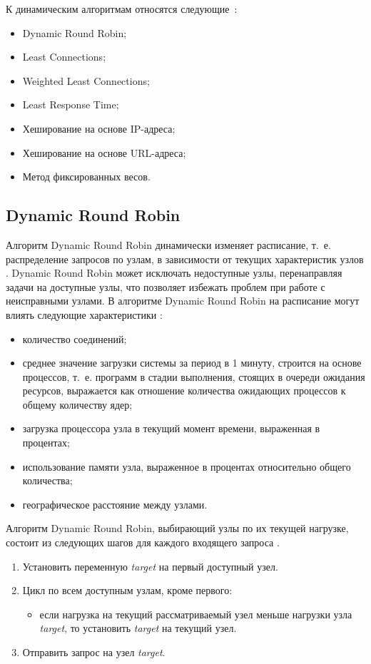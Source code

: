 К динамическим алгоритмам относятся следующие~\cite{drr, dll_warsh, mainsource}:
\begin{itemize}
	\item Dynamic Round Robin;
	\item Least Connections;
	\item Weighted Least Connections;
	\item Least Response Time;
	\item Хеширование на основе IP-адреса;
	\item Хеширование на основе URL-адреса;
	\item Метод фиксированных весов.
\end{itemize}


\subsection{Dynamic Round Robin}

Алгоритм Dynamic Round Robin динамически изменяет расписание, т.~е. распределение запросов по узлам, в зависимости от текущих характеристик узлов \cite{drr}. Dynamic Round Robin может исключать недоступные узлы, перенаправляя задачи на доступные узлы, что позволяет избежать проблем при работе с неисправными узлами. 
В алгоритме Dynamic Round Robin на расписание могут влиять следующие характеристики \cite{dll_warsh, com_analysis, part_algos}: 
\begin{itemize}
	\item количество соединений;
	\item среднее значение загрузки системы за период в 1 минуту, строится на основе процессов, т.~е. программ в стадии выполнения, стоящих в очереди ожидания ресурсов, выражается как отношение количества ожидающих процессов к общему количеству ядер;
	\item загрузка процессора узла в текущий момент времени, выраженная в процентах;
	\item использование памяти узла, выраженное в процентах относительно общего количества;
	\item географическое расстояние между узлами.
\end{itemize}
Алгоритм Dynamic Round Robin, выбирающий узлы по их текущей нагрузке, состоит из следующих шагов для каждого входящего запроса  \cite{com_analysis}.
\begin{enumerate}
	\item Установить переменную \textit{target} на первый доступный узел.
	\item Цикл по всем доступным узлам, кроме первого:
	 \begin{itemize}
	 	\item если нагрузка на текущий рассматриваемый узел меньше нагрузки узла \textit{target}, то установить \textit{target} на текущий узел.
	 \end{itemize}
	\item Отправить запрос на узел \textit{target}.
\end{enumerate}

